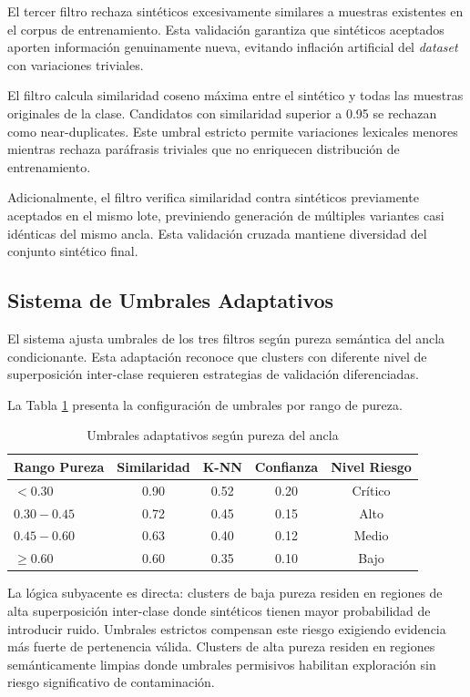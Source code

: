 El tercer filtro rechaza sintéticos excesivamente similares a muestras existentes en el corpus de entrenamiento. Esta validación garantiza que sintéticos aceptados aporten información genuinamente nueva, evitando inflación artificial del \textit{dataset} con variaciones triviales.

El filtro calcula similaridad coseno máxima entre el sintético y todas las muestras originales de la clase. Candidatos con similaridad superior a 0.95 se rechazan como near-duplicates. Este umbral estricto permite variaciones lexicales menores mientras rechaza paráfrasis triviales que no enriquecen distribución de entrenamiento.

Adicionalmente, el filtro verifica similaridad contra sintéticos previamente aceptados en el mismo lote, previniendo generación de múltiples variantes casi idénticas del mismo ancla. Esta validación cruzada mantiene diversidad del conjunto sintético final.

\subsection{Sistema de Umbrales Adaptativos}
\label{subsec:umbrales_adaptativos}

El sistema ajusta umbrales de los tres filtros según pureza semántica del ancla condicionante. Esta adaptación reconoce que clusters con diferente nivel de superposición inter-clase requieren estrategias de validación diferenciadas.

La Tabla \ref{tab:adaptive_thresholds} presenta la configuración de umbrales por rango de pureza.

\begin{table}[h]
\centering
\caption{Umbrales adaptativos según pureza del ancla}
\label{tab:adaptive_thresholds}
\begin{tabular}{lcccc}
\hline
Rango Pureza & Similaridad & K-NN & Confianza & Nivel Riesgo \\
\hline
$< 0.30$ & 0.90 & 0.52 & 0.20 & Crítico \\
$0.30 - 0.45$ & 0.72 & 0.45 & 0.15 & Alto \\
$0.45 - 0.60$ & 0.63 & 0.40 & 0.12 & Medio \\
$\geq 0.60$ & 0.60 & 0.35 & 0.10 & Bajo \\
\hline
\end{tabular}
\end{table}

La lógica subyacente es directa: clusters de baja pureza residen en regiones de alta superposición inter-clase donde sintéticos tienen mayor probabilidad de introducir ruido. Umbrales estrictos compensan este riesgo exigiendo evidencia más fuerte de pertenencia válida. Clusters de alta pureza residen en regiones semánticamente limpias donde umbrales permisivos habilitan exploración sin riesgo significativo de contaminación.

